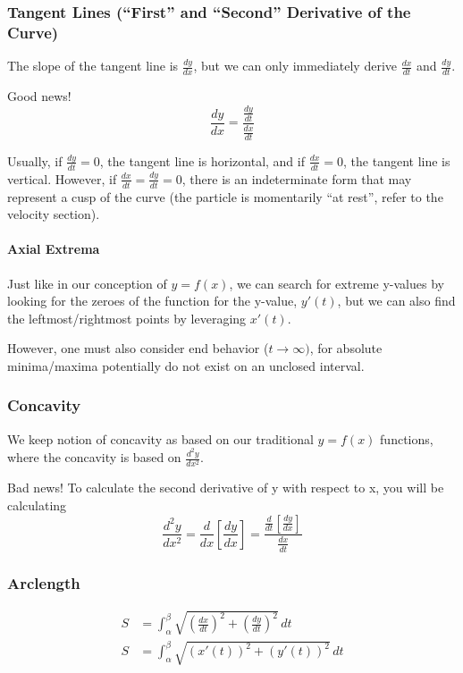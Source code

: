 \documentclass{article}
\begin{document}
\subsubsection{Tangent Lines (``First'' and ``Second'' Derivative of the Curve)}
The slope of the tangent line is $\frac{dy}{dx}$, but we can only immediately derive $\frac{dx}{dt}$ and $\frac{dy}{dt}$.

Good news!
$$\frac{dy}{dx} = \frac{\frac{dy}{dt}}{\frac{dx}{dt}}$$

Usually, if $\frac{dy}{dt} = 0$, the tangent line is horizontal, and if $\frac{dx}{dt} = 0$, the tangent line is vertical. However, if $\frac{dx}{dt} = \frac{dy}{dt} = 0$, there is an indeterminate form that may represent a cusp of the curve (the particle is momentarily ``at rest'', refer to the velocity section).

\paragraph{Axial Extrema}
Just like in our conception of $y=f(x)$, we can search for extreme y-values by looking for the zeroes of the function for the y-value, $y'(t)$, but we can also find the leftmost/rightmost points by leveraging $x'(t)$.

However, one must also consider end behavior ($t \to \infty)$, for absolute minima/maxima potentially do not exist on an unclosed interval.

\subsubsection{Concavity}
We keep notion of concavity as based on our traditional $y=f(x)$ functions, where the concavity is based on $\frac{d^2y}{dx^2}$.

Bad news! To calculate the second derivative of y with respect to x, you will be calculating
$$\frac{d^2y}{dx^2} = \frac{d}{dx}\left[\frac{dy}{dx}\right] = \frac{\frac{d}{dt}\left[\frac{dy}{dx}\right]}{\frac{dx}{dt}}$$

\subsubsection{Arclength}
\begin{align*}
    S &= \int_{\alpha}^{\beta} \sqrt{\left(\frac{dx}{dt}\right)^2 + \left(\frac{dy}{dt}\right)^2} \,dt \\
    S &= \int_{\alpha}^{\beta} \sqrt{(x'(t))^2 + (y'(t))^2} \,dt
\end{align*}
\end{document}
